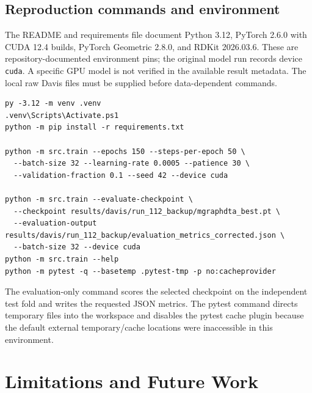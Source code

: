 \section{Reproduction commands and environment}
The README and requirements file document Python 3.12, PyTorch 2.6.0 with CUDA 12.4 builds, PyTorch Geometric 2.8.0, and RDKit 2026.03.6. These are repository-documented environment pins; the original model run records device \texttt{cuda}. A specific GPU model is not verified in the available result metadata. The local raw Davis files must be supplied before data-dependent commands.
\begin{lstlisting}[caption={Documented environment and primary run commands}]
py -3.12 -m venv .venv
.venv\Scripts\Activate.ps1
python -m pip install -r requirements.txt

python -m src.train --epochs 150 --steps-per-epoch 50 \
  --batch-size 32 --learning-rate 0.0005 --patience 30 \
  --validation-fraction 0.1 --seed 42 --device cuda

python -m src.train --evaluate-checkpoint \
  --checkpoint results/davis/run_112_backup/mgraphdta_best.pt \
  --evaluation-output results/davis/run_112_backup/evaluation_metrics_corrected.json \
  --batch-size 32 --device cuda
python -m src.train --help
python -m pytest -q --basetemp .pytest-tmp -p no:cacheprovider
\end{lstlisting}
The evaluation-only command scores the selected checkpoint on the independent test fold and writes the requested JSON metrics. The pytest command directs temporary files into the workspace and disables the pytest cache plugin because the default external temporary/cache locations were inaccessible in this environment.

\chapter{Limitations and Future Work}
